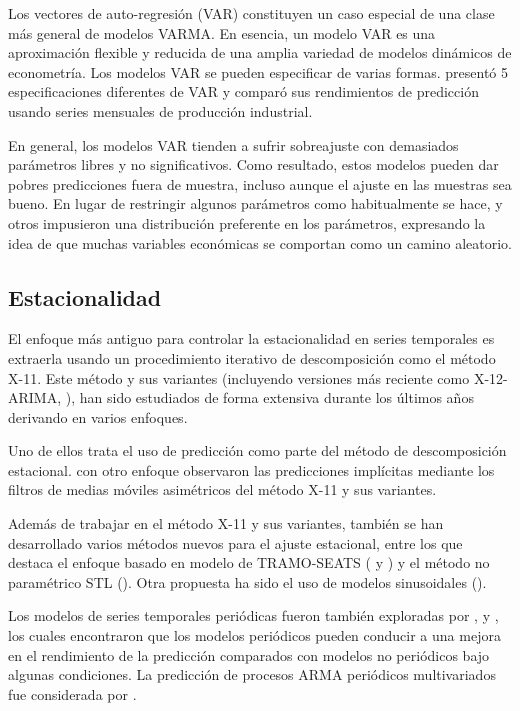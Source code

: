 \documentclass{llncs}
\begin{document}
Los vectores de auto-regresión (VAR) constituyen un caso especial de una clase más general de modelos VARMA. En esencia, un modelo VAR es una aproximación flexible y reducida de una amplia variedad de modelos dinámicos de econometría. Los modelos VAR se pueden especificar de varias formas. \cite{Funke1990363} presentó 5 especificaciones diferentes de VAR y comparó sus rendimientos de predicción usando series mensuales de producción industrial.

En general, los modelos VAR tienden a sufrir sobreajuste con demasiados parámetros libres y no significativos. Como resultado, estos modelos pueden dar pobres predicciones fuera de muestra, incluso aunque el ajuste en las muestras sea bueno. En lugar de restringir algunos parámetros como habitualmente se hace, \cite{Litterman198625} y otros impusieron una distribución preferente en los parámetros, expresando la idea de que muchas variables económicas se comportan como un camino aleatorio. 

\subsection{Estacionalidad}
El enfoque más antiguo para controlar la estacionalidad en series temporales es extraerla usando un procedimiento iterativo de descomposición como el método X-11. Este método y sus variantes (incluyendo versiones más reciente como X-12-ARIMA, \cite{Findley1998127}), han sido estudiados de forma extensiva durante los últimos años derivando en varios enfoques.

Uno de ellos trata el uso de predicción como parte del método de descomposición estacional. \cite{Quenneville2003727} con otro enfoque observaron las predicciones implícitas mediante los filtros de medias móviles asimétricos del método X-11 y sus variantes. 

Además de trabajar en el método X-11 y sus variantes, también se han desarrollado varios métodos nuevos para el ajuste estacional, entre los que destaca el enfoque basado en modelo de TRAMO-SEATS (\cite{Gomez2001} y \cite{Kaiser2005691}) y el método no paramétrico STL (\cite{Cleveland19903}). Otra propuesta ha sido el uso de modelos sinusoidales (\cite{Simmons1990485}).

Los modelos de series temporales periódicas fueron también exploradas por \cite{Wells1997407}, \cite{Herwartz1997421} y \cite{Novales1997393}, los cuales encontraron que los modelos periódicos pueden conducir a una mejora en el rendimiento de la predicción comparados con modelos no periódicos bajo algunas condiciones. La predicción de procesos ARMA periódicos multivariados fue considerada por \cite{Ula1993645}.
\end{document}
